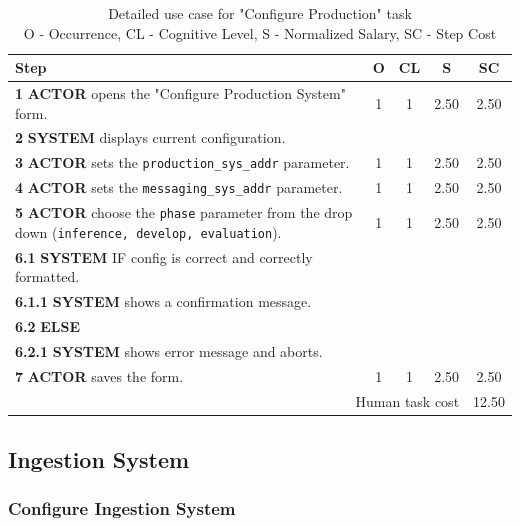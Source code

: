 \begin{table}[H]
    \centering
    \begin{tabularx}{\textwidth}{|X|c|c|c|c|}
    \hline
    \textbf{Step} & \textbf{O} & \textbf{CL} & \textbf{S} & \textbf{SC} \\
    \hline
    \textbf{1} \textbf{ACTOR} opens the "Configure Production System" form. & 1 & 1 & 2.50 & 2.50 \\
    \hline
    \textbf{2} \textbf{SYSTEM} displays current configuration. & & & & \\
    \hline
    \textbf{3} \textbf{ACTOR} sets the \texttt{production\_sys\_addr} parameter. & 1 & 1 & 2.50 & 2.50 \\
    \hline
    \textbf{4} \textbf{ACTOR} sets the \texttt{messaging\_sys\_addr} parameter. &  1 & 1 & 2.50 & 2.50 \\
    \hline
    \textbf{5} \textbf{ACTOR} choose the \texttt{phase} parameter from the drop down (\texttt{inference, develop, evaluation}). & 1 & 1 & 2.50 & 2.50 \\
    \hline
    \textbf{6.1} \textbf{SYSTEM} IF config is correct and correctly formatted. & & & & \\
    \hline
    \textbf{6.1.1} \textbf{SYSTEM} shows a confirmation message. & & & & \\
    \hline
    \textbf{6.2} \textbf{ELSE} & & & & \\
    \hline
    \textbf{6.2.1} \textbf{SYSTEM} shows error message and aborts. & & & & \\
    \hline
    \textbf{7} \textbf{ACTOR} saves the form. & 1 & 1 & 2.50 & 2.50 \\
    \hline
    \multicolumn{4}{|r|}{Human task cost} & 12.50 \\
    \hline
    \end{tabularx}
    
    \caption{Detailed use case for "Configure Production" task\\ 
    O - Occurrence, CL - Cognitive Level, S - Normalized Salary, SC - Step Cost}
    \label{table:configure_production_system}
    \end{table}



\subsection{Ingestion System}

\subsubsection{Configure Ingestion System}

